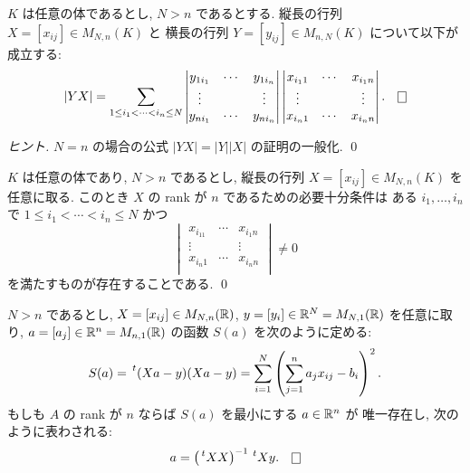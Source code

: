\documentclass[12pt,twoside]{jarticle}
\begin{document}
\begin{question}[Laplace展開, 10点]
  $K$ は任意の体であるとし, $N > n$ であるとする.
  縦長の行列 $X=[x_{ij}]\in M_{N,n}(K)$ と
  横長の行列 $Y=[y_{ij}]\in M_{n,N}(K)$ について以下が成立する:
  \begin{equation*}
    |YX| =
    \sum_{1\le i_1<\cdots<i_n\le N}
    \begin{vmatrix}
      y_{1i_1} & \cdots & y_{1i_n} \\
      \vdots   &        & \vdots   \\
      y_{ni_1} & \cdots & y_{ni_n} \\
    \end{vmatrix}
    \begin{vmatrix}
      x_{i_11} & \cdots & x_{i_1n} \\
      \vdots   &        & \vdots   \\
      x_{i_n1} & \cdots & x_{i_nn} \\
    \end{vmatrix}.
    \qed
  \end{equation*}
\end{question}

\begin{proof}[ヒント]
  $N=n$ の場合の公式 $|YX|=|Y||X|$ の証明の一般化. \qed
\end{proof}

\begin{question}[5点]
  $K$ は任意の体であり,  $N > n$ であるとし, 
  縦長の行列 $X=[x_{ij}]\in M_{N,n}(K)$ を任意に取る.
  このとき $X$ の rank が $n$ であるための必要十分条件は
  ある $i_1,\ldots,i_n$ で $1\le i_1<\cdots<i_n\le N$ かつ
  \begin{equation*}
    \begin{vmatrix}
      x_{i_11} & \cdots & x_{i_1n} \\
      \vdots   &        & \vdots   \\
      x_{i_n1} & \cdots & x_{i_nn} \\
    \end{vmatrix}
    \ne 0
  \end{equation*}
  を満たすものが存在することである.  \qed
\end{question}

\begin{question}[最小二乗法, 5点]
  $N>n$ であるとし, $X=[x_{ij}]\in M_{N,n}({\mathbb R})$, 
  $y=[y_i]\in{\mathbb R}^N=M_{N,1}({\mathbb R})$ を任意に取り, 
  $a=[a_j]\in{\mathbb R}^n=M_{n,1}({\mathbb R})$ の函数 $S(a)$ を次のように定める:
  \begin{equation*}
    S(a) = \tp{(Xa-y)}(Xa-y)
    = \sum_{i=1}^N
    \left(
      \sum_{j=1}^n a_j x_{ij} - b_i
    \right)^2.
  \end{equation*}
  もしも $A$ の rank が $n$ ならば $S(a)$ を最小にする $a\in{\mathbb R}^n$ が
  唯一存在し, 次のように表わされる:
  \begin{equation*}
    a = \left( \tp{X}X \right)^{-1} \tp{X}y.
    \qed
  \end{equation*}
\end{question}
\end{document}
